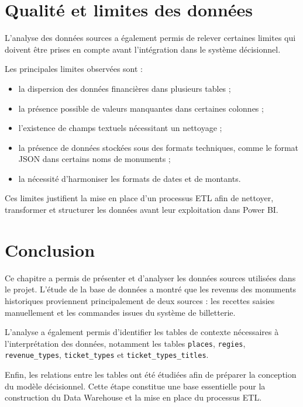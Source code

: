 \documentclass[12pt,a4paper]{report}
\begin{document}

\section{Qualité et limites des données}

L’analyse des données sources a également permis de relever certaines limites qui doivent être prises en compte avant l’intégration dans le système décisionnel.

Les principales limites observées sont :

\begin{itemize}
	\item la dispersion des données financières dans plusieurs tables ;
	\item la présence possible de valeurs manquantes dans certaines colonnes ;
	\item l’existence de champs textuels nécessitant un nettoyage ;
	\item la présence de données stockées sous des formats techniques, comme le format JSON dans certains noms de monuments ;
	\item la nécessité d’harmoniser les formats de dates et de montants.
\end{itemize}

Ces limites justifient la mise en place d’un processus ETL afin de nettoyer, transformer et structurer les données avant leur exploitation dans Power BI.


\section*{Conclusion}

Ce chapitre a permis de présenter et d’analyser les données sources utilisées dans le projet. L’étude de la base de données a montré que les revenus des monuments historiques proviennent principalement de deux sources : les recettes saisies manuellement et les commandes issues du système de billetterie.

L’analyse a également permis d’identifier les tables de contexte nécessaires à l’interprétation des données, notamment les tables \texttt{places}, \texttt{regies}, \texttt{revenue\_types}, \texttt{ticket\_types} et \texttt{ticket\_types\_titles}.

Enfin, les relations entre les tables ont été étudiées afin de préparer la conception du modèle décisionnel. Cette étape constitue une base essentielle pour la construction du Data Warehouse et la mise en place du processus ETL.
\end{document}
